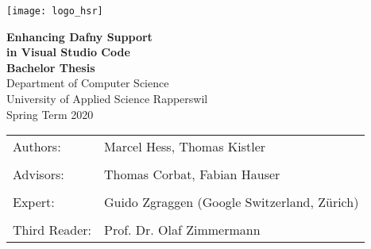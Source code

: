 \begin{titlepage}
\thispagestyle{empty}

\newcommand\thesisAuthors{Marcel Hess, Thomas Kistler}
\newcommand\thesisTitleFirst{Enhancing Dafny Support}
\newcommand\thesisTitleNd{in Visual Studio Code}
\newcommand\thesisSubject{Bachelor Thesis}
\newcommand\thesisUniversity{University of Applied Science Rapperswil}
\newcommand\thesisDepartment{Department of Computer Science}
\newcommand\thesisAdvisors{Thomas Corbat, Fabian Hauser}
\newcommand\thesisExpert{Guido Zgraggen (Google Switzerland, Zürich)}
\newcommand\thesisPeriod{Spring Term 2020}
\newcommand\thesisReader{Prof. Dr. Olaf Zimmermann}

    \texttt{[image: logo\_hsr]}\\[40mm]

    \begin{center}

    	\Huge
    	\textbf{\thesisTitleFirst} \\
    	\textbf{\thesisTitleNd} \\[5mm]
    	\textbf{\thesisSubject} \\[20mm]

    	\LARGE
    	\thesisDepartment\\
    	\thesisUniversity\\[10mm]

    	\thesisPeriod \\[15mm]

    	\vfill

    \end{center}

\begin{tabularx}{\textwidth}{l X}
			\large Authors: & \large{ \thesisAuthors} \tabularnewline
			\tabularnewline
			\large Advisors: & \large{\thesisAdvisors} \tabularnewline
			\tabularnewline
			\large Expert: & \large \thesisExpert \tabularnewline
			\tabularnewline
			\large Third Reader: & \large \thesisReader
		\end{tabularx}

\end{titlepage}
